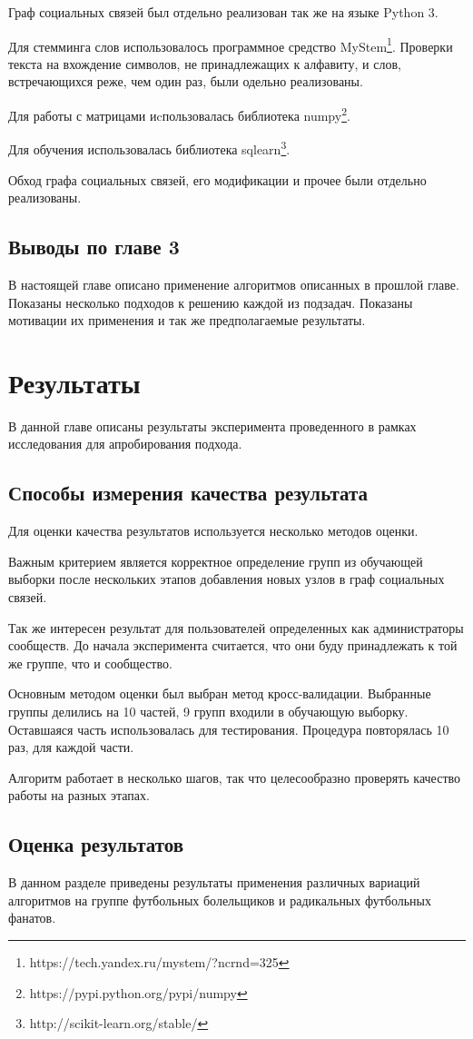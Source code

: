 \documentclass[annotation,times,page4]{itmo-student-thesis}
\begin{document}
Граф социальных связей был отдельно реализован так же на языке Python 3.

Для стемминга слов использовалось программное средство MyStem\footnote{https://tech.yandex.ru/mystem/?ncrnd=325}. Проверки текста на вхождение символов, не принадлежащих к алфавиту, и слов, встречающихся реже, чем один раз, были одельно реализованы.

Для работы с матрицами иcпользовалась библиотека numpy\footnote{https://pypi.python.org/pypi/numpy}.

Для обучения использовалась библиотека sqlearn\footnote{http://scikit-learn.org/stable/}.

Обход графа социальных связей, его модификации и прочее были отдельно реализованы.

\section{Выводы по главе 3}
В настоящей главе описано применение алгоритмов описанных в прошлой главе. Показаны несколько подходов к решению каждой из подзадач. Показаны мотивации их применения и так же предполагаемые результаты. 
\chapter{Результаты}
В данной главе описаны результаты эксперимента проведенного в рамках исследования для апробирования подхода.
\section{Способы измерения качества результата}
Для оценки качества результатов используется несколько методов оценки.

Важным критерием является корректное определение групп из обучающей выборки после нескольких этапов добавления новых узлов в граф социальных связей. 

Так же интересен результат для пользователей определенных как администраторы сообществ. До начала эксперимента считается, что они буду принадлежать к той же группе, что и сообщество.

Основным методом оценки был выбран метод кросс-валидации. Выбранные группы делились на 10 частей, 9 групп входили в обучающую выборку. Оставшаяся часть использовалась для тестирования. Процедура повторялась 10 раз, для каждой части.

Алгоритм работает в несколько шагов, так что целесообразно проверять качество работы на разных этапах.
\section{Оценка результатов}
В данном разделе приведены результаты применения различных вариаций алгоритмов на группе футбольных болельщиков и радикальных футбольных фанатов.
\end{document}
